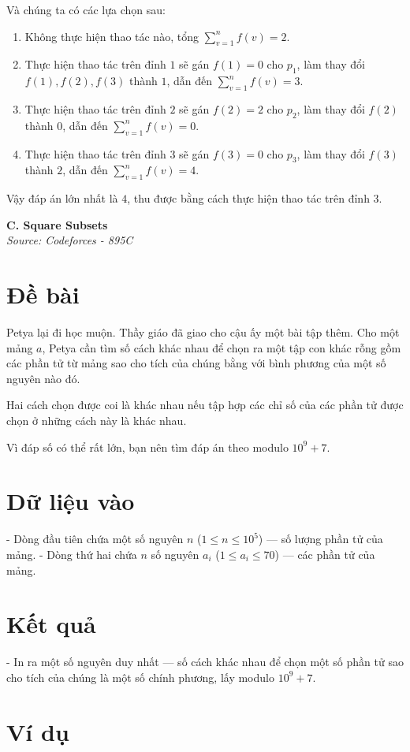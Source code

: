 \documentclass[11pt]{article}
\newcommand{\problem}[2]{
    \begin{problembox}
    \begin{center}
        \Large \textbf{#1} \\
        \vspace{0.2cm}
        \small \textit{Source: #2}
    \end{center}
    \end{problembox}
}
\begin{document}
Và chúng ta có các lựa chọn sau:
\begin{enumerate}
    \item Không thực hiện thao tác nào, tổng $\sum_{v = 1}^n f(v) = 2$.
    \item Thực hiện thao tác trên đỉnh $1$ sẽ gán $f(1) = 0$ cho $p_1$, làm thay đổi $f(1), f(2), f(3)$ thành $1$, dẫn đến $\sum_{v = 1}^n f(v) = 3$.
    \item Thực hiện thao tác trên đỉnh $2$ sẽ gán $f(2) = 2$ cho $p_2$, làm thay đổi $f(2)$ thành $0$, dẫn đến $\sum_{v = 1}^n f(v) = 0$.
    \item Thực hiện thao tác trên đỉnh $3$ sẽ gán $f(3) = 0$ cho $p_3$, làm thay đổi $f(3)$ thành $2$, dẫn đến $\sum_{v = 1}^n f(v) = 4$.
\end{enumerate}

Vậy đáp án lớn nhất là $4$, thu được bằng cách thực hiện thao tác trên đỉnh $3$.

\newpage
\problem{C. Square Subsets}{Codeforces - 895C}

\section*{Đề bài}
Petya lại đi học muộn. Thầy giáo đã giao cho cậu ấy một bài tập thêm. Cho một mảng $a$, Petya cần tìm số cách khác nhau để chọn ra một tập con khác rỗng gồm các phần tử từ mảng sao cho tích của chúng bằng với bình phương của một số nguyên nào đó.

Hai cách chọn được coi là khác nhau nếu tập hợp các chỉ số của các phần tử được chọn ở những cách này là khác nhau.

Vì đáp số có thể rất lớn, bạn nên tìm đáp án theo modulo $10^9+7$.

\section*{Dữ liệu vào}
- Dòng đầu tiên chứa một số nguyên $n$ ($1 \le n \le 10^5$) — số lượng phần tử của mảng.
- Dòng thứ hai chứa $n$ số nguyên $a_i$ ($1 \le a_i \le 70$) — các phần tử của mảng.

\section*{Kết quả}
- In ra một số nguyên duy nhất — số cách khác nhau để chọn một số phần tử sao cho tích của chúng là một số chính phương, lấy modulo $10^9+7$.

\section*{Ví dụ}
\begin{example}
\begin{exmp}
\end{exmp}
\begin{exmp}
\end{exmp}
\begin{exmp}
\end{exmp}
\end{example}
\end{document}
